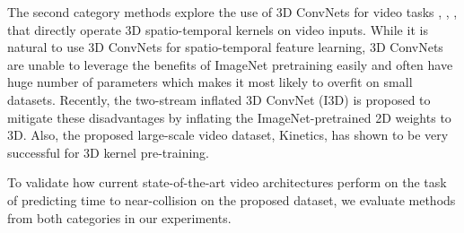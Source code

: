 The second category methods explore the use of 3D ConvNets for video tasks \cite{C3D}, \cite{videoResNet}, \cite{p3d}, \cite{two-stream} that directly operate 3D spatio-temporal kernels on video inputs. While it is natural to use 3D ConvNets for spatio-temporal feature learning, 3D ConvNets are unable to leverage the benefits of ImageNet pretraining easily and often have huge number of parameters which makes it most likely to overfit on small datasets. Recently, the two-stream inflated 3D ConvNet (I3D) \cite{i3d} is proposed to mitigate these disadvantages by inflating the ImageNet-pretrained 2D weights to 3D. Also, the proposed large-scale video dataset, Kinetics, has shown to be very successful for 3D kernel pre-training.
 

To validate how current state-of-the-art video architectures perform on the task of predicting time to near-collision on the proposed dataset, we evaluate methods from both categories in our experiments.



